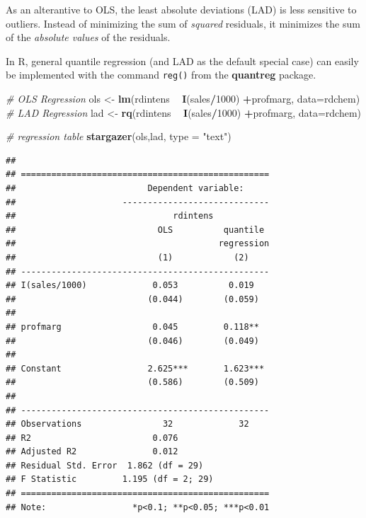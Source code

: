 \documentclass[]{book}
\newenvironment{Shaded}{\begin{snugshade}}{\end{snugshade}}
\newcommand{\CommentTok}[1]{\textcolor[rgb]{0.56,0.35,0.01}{\textit{#1}}}
\newcommand{\DataTypeTok}[1]{\textcolor[rgb]{0.13,0.29,0.53}{#1}}
\newcommand{\DecValTok}[1]{\textcolor[rgb]{0.00,0.00,0.81}{#1}}
\newcommand{\KeywordTok}[1]{\textcolor[rgb]{0.13,0.29,0.53}{\textbf{#1}}}
\newcommand{\NormalTok}[1]{#1}
\newcommand{\OperatorTok}[1]{\textcolor[rgb]{0.81,0.36,0.00}{\textbf{#1}}}
\newcommand{\StringTok}[1]{\textcolor[rgb]{0.31,0.60,0.02}{#1}}
\begin{document}
As an alterantive to OLS, the least absolute deviations (LAD) is less
sensitive to outliers. Instead of minimizing the sum of \emph{squared}
residuals, it minimizes the sum of the \emph{absolute values} of the
residuals.

In R, general quantile regression (and LAD as the default special case)
can easily be implemented with the command \texttt{reg()} from the
\textbf{quantreg} package.

\begin{Shaded}
\begin{Highlighting}[]
\CommentTok{# OLS Regression}
\NormalTok{ols <-}\StringTok{ }\KeywordTok{lm}\NormalTok{(rdintens }\OperatorTok{~}\StringTok{ }\KeywordTok{I}\NormalTok{(sales}\OperatorTok{/}\DecValTok{1000}\NormalTok{) }\OperatorTok{+}\NormalTok{profmarg, }\DataTypeTok{data=}\NormalTok{rdchem)}
\CommentTok{# LAD Regression}
\NormalTok{lad <-}\StringTok{ }\KeywordTok{rq}\NormalTok{(rdintens }\OperatorTok{~}\StringTok{ }\KeywordTok{I}\NormalTok{(sales}\OperatorTok{/}\DecValTok{1000}\NormalTok{) }\OperatorTok{+}\NormalTok{profmarg, }\DataTypeTok{data=}\NormalTok{rdchem)}

\CommentTok{# regression table}
\KeywordTok{stargazer}\NormalTok{(ols,lad,  }\DataTypeTok{type =} \StringTok{"text"}\NormalTok{)}
\end{Highlighting}
\end{Shaded}

\begin{verbatim}
## 
## =================================================
##                          Dependent variable:     
##                     -----------------------------
##                               rdintens           
##                            OLS          quantile 
##                                        regression
##                            (1)            (2)    
## -------------------------------------------------
## I(sales/1000)             0.053          0.019   
##                          (0.044)        (0.059)  
##                                                  
## profmarg                  0.045         0.118**  
##                          (0.046)        (0.049)  
##                                                  
## Constant                 2.625***       1.623*** 
##                          (0.586)        (0.509)  
##                                                  
## -------------------------------------------------
## Observations                32             32    
## R2                        0.076                  
## Adjusted R2               0.012                  
## Residual Std. Error  1.862 (df = 29)             
## F Statistic         1.195 (df = 2; 29)           
## =================================================
## Note:                 *p<0.1; **p<0.05; ***p<0.01
\end{verbatim}
\end{document}
